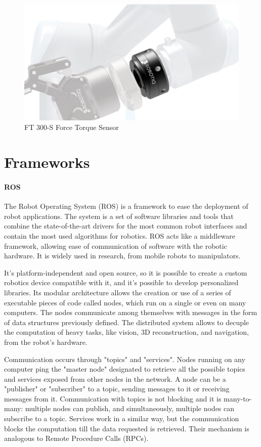 \begin{figure}
	\centering
	\includegraphics[width=0.5\linewidth]{Images/ft_sensor.png}
	\caption{FT 300-S Force Torque Sensor}
	\label{fig:ft-sensor}
\end{figure}


\section{Frameworks}
\paragraph{ROS}
The Robot Operating System (ROS) \cite{url:ros} is a framework to ease the deployment of robot applications. The system is a set of software libraries and tools that combine the state-of-the-art drivers for the most common robot interfaces and contain the most used algorithms for robotics. 
ROS acts like a middleware framework, allowing ease of communication of software with the robotic hardware. It is widely used in research, from mobile robots to manipulators.  

It's platform-independent and open source, so it is possible to create a custom robotics device compatible with it, and it's possible to develop personalized libraries. Its modular architecture allows the creation or use of a series of executable pieces of code called nodes, which run on a single or even on many computers. The nodes communicate among themselves with messages in the form of data structures previously defined. The distributed system allows to decuple the computation of heavy tasks, like vision, 3D reconstruction, and navigation, from the robot's hardware. 

Communication occurs through "topics" and "services". Nodes running on any computer ping the "master node" designated to retrieve all the possible topics and services exposed from other nodes in the network. A node can be a "publisher" or "subscriber" to a topic, sending messages to it or receiving messages from it. Communication with topics is not blocking and it is many-to-many: multiple nodes can publish, and simultaneously, multiple nodes can subscribe to a topic. Services work in a similar way, but the communication blocks the computation till the data requested is retrieved. Their mechanism is analogous to Remote Procedure Calls (RPCs). 

